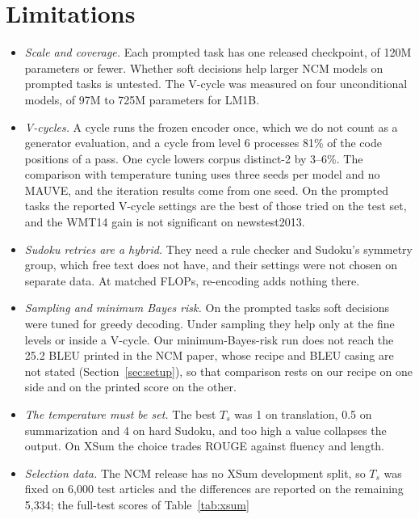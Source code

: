 \documentclass[11pt]{article}
\begin{document}
\section{Limitations}
\label{sec:limits}

\begin{itemize}[leftmargin=*, topsep=4pt, itemsep=3pt, parsep=0pt]
\item \emph{Scale and coverage.} Each prompted task has one released checkpoint, of 120M parameters or fewer.
  Whether soft decisions help larger NCM models on prompted tasks is untested. The V-cycle was measured on four
  unconditional models, of 97M to 725M parameters for LM1B.
\item \emph{V-cycles.} A cycle runs the frozen encoder once, which we do not count as a generator evaluation, and a
  cycle from level 6 processes 81\% of the code positions of a pass. One cycle lowers corpus distinct-2 by 3--6\%. The
  comparison with temperature tuning uses three seeds per model and no MAUVE, and the iteration results come from one
  seed. On the prompted tasks the reported V-cycle settings are the best of those tried on the test set, and the
  WMT14 gain is not significant on newstest2013.
\item \emph{Sudoku retries are a hybrid.} They need a rule checker and Sudoku's symmetry group, which free text
  does not have, and their settings were not chosen on separate data. At matched FLOPs, re-encoding adds nothing
  there.
\item \emph{Sampling and minimum Bayes risk.} On the prompted tasks soft decisions were tuned for greedy decoding.
  Under sampling they help only at the fine levels or inside a V-cycle. Our minimum-Bayes-risk run does not reach the
  25.2 BLEU printed in the NCM paper, whose recipe and BLEU casing are not stated (Section~\ref{sec:setup}), so that
  comparison rests on our recipe on one side and on the printed score on the other.
\item \emph{The temperature must be set.} The best $T_s$ was 1 on translation, 0.5 on summarization and 4 on hard
  Sudoku, and too high a value collapses the output. On XSum the choice trades ROUGE against fluency and length.
\item \emph{Selection data.} The NCM release has no XSum development split, so $T_s$ was fixed on 6,000 test
  articles and the differences are reported on the remaining 5,334; the full-test scores of Table~\ref{tab:xsum}

\end{itemize}
\end{document}
